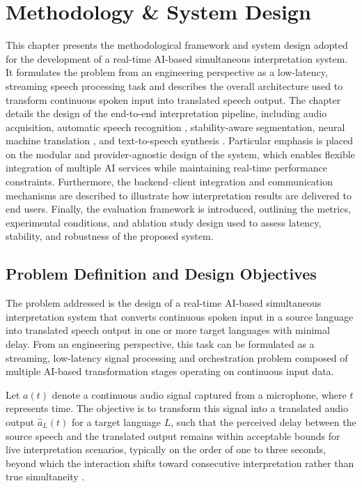 \chapter{Methodology \& System Design}
\label{chapter:methodology}

This chapter presents the methodological framework and system design adopted for the development of a real-time AI-based simultaneous interpretation system. It formulates the problem from an engineering perspective as a low-latency, streaming speech processing task and describes the overall architecture used to transform continuous spoken input into translated speech output. The chapter details the design of the end-to-end interpretation pipeline, including audio acquisition, automatic speech recognition \cite{nayeem2025asr_survey}, stability-aware segmentation, neural machine translation \cite{stahlberg2020nmt_review}, and text-to-speech synthesis \cite{tan2021tts_survey}. Particular emphasis is placed on the modular and provider-agnostic design of the system, which enables flexible integration of multiple AI services while maintaining real-time performance constraints. Furthermore, the backend–client integration and communication mechanisms are described to illustrate how interpretation results are delivered to end users. Finally, the evaluation framework is introduced, outlining the metrics, experimental conditions, and ablation study design used to assess latency, stability, and robustness of the proposed system.

\section{Problem Definition and Design Objectives}
\label{sec:problem_definition}

The problem addressed is the design of a real-time AI-based simultaneous interpretation system that converts continuous spoken input in a source language into translated speech output in one or more target languages with minimal delay. From an engineering perspective, this task can be formulated as a streaming, low-latency signal processing and orchestration problem composed of multiple AI-based transformation stages operating on continuous input data.

Let $a(t)$ denote a continuous audio signal captured from a microphone, where $t$ represents time. The objective is to transform this signal into a translated audio output $\hat{a}_{L}(t)$ for a target language $L$, such that the perceived delay between the source speech and the translated output remains within acceptable bounds for live interpretation scenarios, typically on the order of one to three seconds, beyond which the interaction shifts toward consecutive interpretation rather than true simultaneity \cite{niehues2018simultaneousarxiv, ma2019staclarxiv}.


